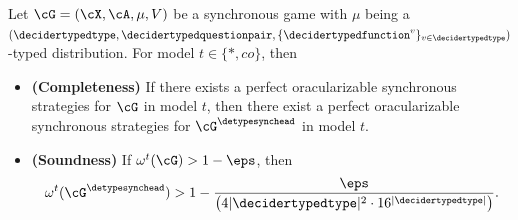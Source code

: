 \begin{lemma} \label{lem:detypeandsync}
	Let $\cG = (\cX, \cA, \mu, V)$ be a synchronous game with $\mu$ being a $(\decidertypedtype, \decidertypedquestionpair, \{\decidertypedfunction^v \}_{v \in \decidertypedtype})$-typed distribution. For model $t \in \{*, co\}$, then 
	\begin{itemize}
		\item \textbf{(Completeness)} If there exists a perfect oracularizable synchronous strategies for $\cG$ in model $t$, then there exist a perfect oracularizable synchronous strategies for $\cG^{\detypesynchead}$ in model $t$. 
		\item  \textbf{(Soundness)} If $\omega^t(\cG) > 1 - \eps$, then 
		\begin{equation*}
			\omega^{t}(\cG^{\detypesynchead}) > 1 - \frac{\eps}{\left(4|\decidertypedtype|^2 \cdot 16^{|\decidertypedtype|}\right)} . 
		\end{equation*}
	\end{itemize}
\end{lemma}
